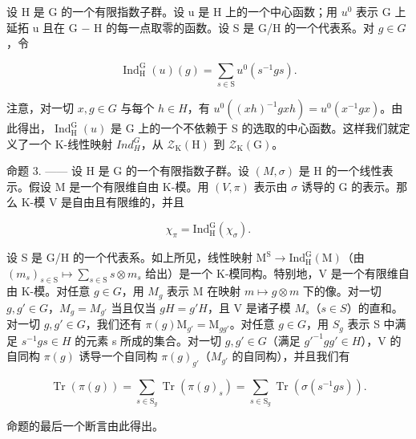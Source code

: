 设 H 是 G 的一个有限指数子群。设 u 是 H 上的一个中心函数；用 \(u^{0}\) 表示 G 上延拓 u 且在 G − H 的每一点取零的函数。设 S 是 G/H 的一个代表系。对 \(g \in G\)，令

\[
\operatorname{Ind} _ {\mathrm{H}} ^ {\mathrm{G}} (u) (g) = \sum_ {s \in \mathrm{S}} u ^ {0} (s ^ {- 1} g s).\tag{4}
\]

注意，对一切 \(x, g \in G\) 与每个 \(h \in H\)，有 \(u^{0}((xh)^{-1}gxh) = u^{0}(x^{-1}gx)\)。由此得出，\(\operatorname{Ind}_{\mathrm{H}}^{\mathrm{G}}(u)\) 是 G 上的一个不依赖于 S 的选取的中心函数。这样我们就定义了一个 K-线性映射 \(Ind_{H}^{G}\)，从 \(\mathcal{Z}_{\mathrm{K}}(\mathrm{H})\) 到 \(\mathcal{Z}_{\mathrm{K}}(\mathrm{G})\)。

命题 3. —— 设 H 是 G 的一个有限指数子群。设 \((M,\sigma)\) 是 H 的一个线性表示。假设 M 是一个有限维自由 K-模。用 \((V,\pi)\) 表示由 \(\sigma\) 诱导的 G 的表示。那么 K-模 V 是自由且有限维的，并且

\[
\chi_ {\pi} = \mathrm{Ind} _ {\mathrm{H}} ^ {\mathrm{G}} (\chi_ {\sigma}).\tag{5}
\]

设 S 是 G/H 的一个代表系。如上所见，线性映射 \(\mathrm{M}^{\mathrm{S}}\to\mathrm{Ind}_{\mathrm{H}}^{\mathrm{G}}(\mathrm{M})\)（由 \((m_{s})_{s\in\mathrm{S}}\mapsto\sum_{s\in\mathrm{S}}s\otimes m_{s}\) 给出）是一个 K-模同构。特别地，V 是一个有限维自由 K-模。对任意 \(g\in G\)，用 \(M_{g}\) 表示 M 在映射 \(m\mapsto g\otimes m\) 下的像。对一切 \(g,g'\in G\)，\(M_{g}=M_{g'}\) 当且仅当 \(gH=g'H\)，且 V 是诸子模 \(M_{s}\)（\(s\in S\)）的直和。对一切 \(g,g'\in G\)，我们还有 \(\pi(g)\mathrm{M}_{g'}=\mathrm{M}_{gg'}\)。对任意 \(g\in G\)，用 \(S_{g}\) 表示 S 中满足 \(s^{-1}gs\in H\) 的元素 s 所成的集合。对一切 \(g,g'\in G\)（满足 \(g'^{-1}gg'\in H\)），V 的自同构 \(\pi(g)\) 诱导一个自同构 \(\pi(g)_{g'}\)（\(M_{g'}\) 的自同构），并且我们有

\[
\operatorname{Tr} (\pi (g)) = \sum_ {s \in \mathrm{S} _ {g}} \operatorname{Tr} (\pi (g) _ {s}) = \sum_ {s \in \mathrm{S} _ {g}} \operatorname{Tr} (\sigma (s ^ {- 1} g s)).
\]

命题的最后一个断言由此得出。

